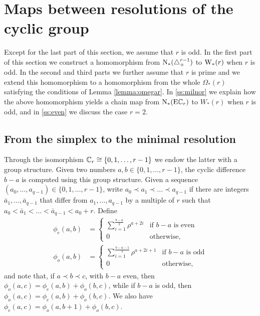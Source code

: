 
\section{Maps between resolutions of the cyclic group}\label{s:resolutions}

Except for the last part of this section, we assume that $r$ is odd. In the first part of this section we construct a homomorphism from $\operatorname{N}_*(\triangle_{+}^{r-1})$ to $\mathrm{W}_*(r)$ when $r$ is odd. In the second and third parts we further assume that $r$ is prime and we extend this homomorphism to a homomorphism from the whole $\Omega_*(r)$ satisfying the conditions of Lemma \ref{lemma:omegar}. In \cref{ss:milnor} we explain how the above homomorphism yields a chain map from $\operatorname{N}_*(\mathrm{E}\mathbb{C}_r)$ to $W_*(r)$ when $r$ is odd, and in \cref{ss:even} we discuss the case $r=2$.

\subsection{From the simplex to the minimal resolution}

Through the isomorphism $\mathbb{C}_r \cong \{0,1,\ldots,r-1\}$ we endow the latter with a group structure. Given two numbers $a,b\in \{0,1,\ldots,r-1\}$, the cyclic difference $b-a$ is computed using this group structure. Given a sequence $(a_0,\ldots,a_{q-1})\in \{0,1,\ldots,r-1\}$, write $a_0\prec a_1\prec \ldots\prec a_{q-1}$ if there are integers $\bar{a}_1,\ldots,\bar{a}_{q-1}$ that differ from $a_1,\ldots,a_{q-1}$ by a multiple of $r$ such that $a_0<\bar{a}_1<\ldots<\bar{a}_{q-1}<a_0+r$. Define
\begin{align*}
	\phi_{e}(a,b) &= \begin{cases}
		\displaystyle \sum_{i=1}^{\frac{b-a}{2}} \rho^{a+2i} & \text{if $b-a$ is even} \\
		0 & \text{otherwise,}
	\end{cases}
	\\
	\phi_{o}(a,b) &= \begin{cases}
		\displaystyle \sum_{i=1}^{\frac{b-a-1}{2}} \rho^{a+2i+1} & \text{if $b-a$ is odd} \\
		0 & \text{otherwise,}
	\end{cases}
\end{align*}
and note that, if $a\prec b\prec c$, with $b-a$ even, then $\phi_o(a,c) = \phi_e(a,b) + \phi_o(b,c)$, while if $b-a$ is odd, then $\phi_o(a,c) = \phi_e(a,b) + \phi_o(b,c)$. We also have $\phi_e(a,c) = \phi_o(a,b+1)+\phi_o(b,c)$.

